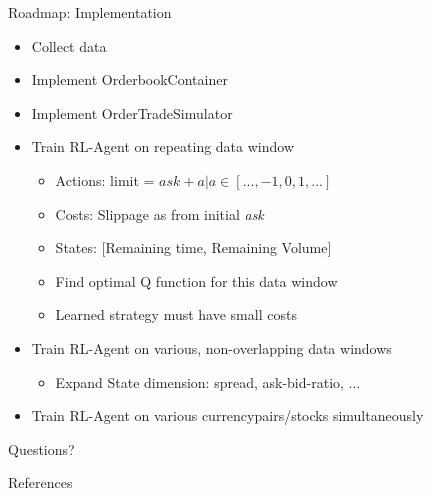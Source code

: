 \documentclass[10pt]{beamer}
\begin{document}
\begin{frame}[fragile]{Roadmap: Implementation}

\begin{itemize}
\item[\checkmark] Collect data 
\item[\checkmark] Implement OrderbookContainer
\item[\checkmark] Implement OrderTradeSimulator
\item[\qed] Train RL-Agent on repeating data window
\begin{itemize}
\item[\checkmark] Actions: limit = $ask +  a | a \in [..., -1, 0, 1, ...]$
\item[\checkmark] Costs: Slippage as from initial \emph{ask}
\item[\checkmark] States: [Remaining time, Remaining Volume]
\item[\qed] Find optimal Q function for this data window
\item[\qed] Learned strategy must have small costs
\end{itemize}
\item[\qed] Train RL-Agent on various, non-overlapping data windows
\begin{itemize}
\item[\qed] Expand State dimension: spread, ask-bid-ratio, ...
\end{itemize}
\item[\qed] Train RL-Agent on various currencypairs/stocks simultaneously
\end{itemize}

\end{frame}

\begin{frame}[standout]
  Questions?
\end{frame}

\appendix

\begin{frame}[allowframebreaks]{References}

  
  

\end{frame}
\end{document}
